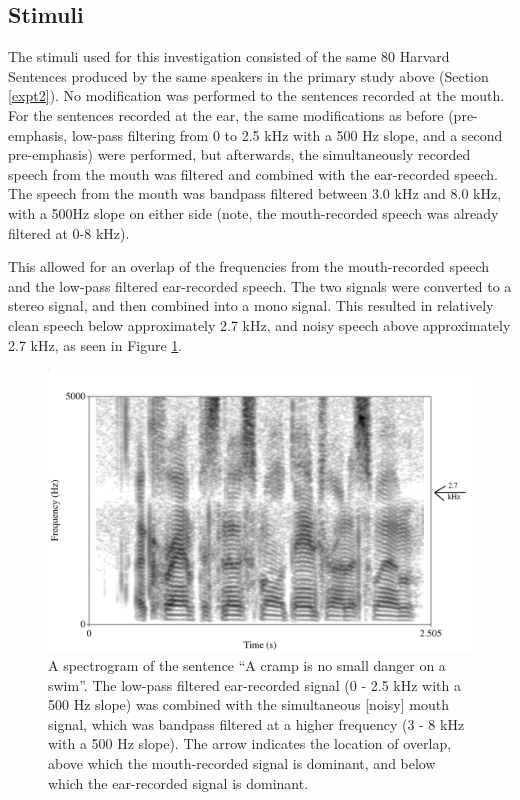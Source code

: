 \subsection{Stimuli}\label{F0-stimuli}

The stimuli used for this investigation consisted of the same 80 Harvard Sentences produced by the same speakers in the primary study above (Section \ref{expt2}).
No modification was performed to the sentences recorded at the mouth.  For the sentences recorded at the ear, the same modifications as before (pre-emphasis, low-pass filtering from 0 to 2.5 kHz with a 500 Hz slope, and a second pre-emphasis) were performed, but afterwards, the simultaneously recorded speech from the mouth was filtered and combined with the ear-recorded speech.  The speech from the mouth was bandpass filtered between 3.0 kHz and 8.0 kHz, with a 500Hz slope on either side (note, the mouth-recorded speech was already filtered at 0-8 kHz).  

This allowed for an overlap of the frequencies from the mouth-recorded speech and the low-pass filtered ear-recorded speech.  The two signals were converted to a stereo signal, and then combined into a mono signal.  This resulted in relatively clean speech below approximately 2.7 kHz, and noisy speech above approximately 2.7 kHz, as seen in Figure \ref{fig:combined-signal}.

\begin{figure}[h]
\centering
  \includegraphics[width=\textwidth]{figure/combined-signal_labeled.png}
  \caption{A spectrogram of the sentence ``A cramp is no small danger on a swim''.  The low-pass filtered ear-recorded signal (0 - 2.5 kHz with a 500 Hz slope) was combined with the simultaneous [noisy] mouth signal, which was bandpass filtered at a higher frequency (3 - 8 kHz with a 500 Hz slope).  The arrow indicates the location of overlap, above which the mouth-recorded signal is dominant, and below which the ear-recorded signal is dominant.}
  \label{fig:combined-signal}
\end{figure}
%

